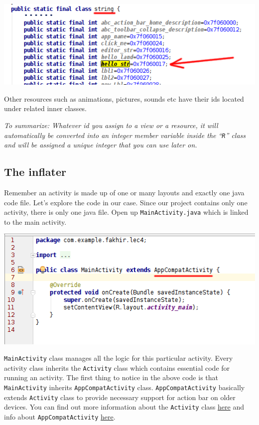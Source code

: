 \begin{center}
	\includegraphics[scale=0.4]{chapters/ch04/images/33}
\end{center}

Other resources such as animations, pictures, sounds etc have their ids located under related inner classes.

\vskip 3mm
\textit{To summarize: Whatever id you assign to a view or a resource, it will automatically be converted into an integer member variable inside the ``\texttt{R}'' class and will be assigned a unique integer that you can use later on.}

\subsection{The inflater}
\label{RAI:inflater}
Remember an activity is made up of one or many layouts and exactly one java code file. Let's explore the code in our case. Since our project contains only one activity, there is only one java file. Open up \texttt{MainActivity.java} which is linked to the main activity. 

\begin{center}
	\includegraphics[scale=0.4]{chapters/ch04/images/34}
\end{center}

\texttt{MainActivity} class manages all the logic for this particular activity. Every activity class inherits the \texttt{Activity} class which contains essential code for running an activity. The first thing to notice in the above code is that \texttt{MainActivity} inherits \texttt{AppCompatActivity} class. \texttt{AppCompatActivity} basically extends \texttt{Activity} class to provide necessary support for action bar on older devices. You can find out more information about the \texttt{Activity} class \href{https://developer.android.com/reference/android/app/Activity.html}{here} and info about \texttt{AppCompatActivity} \href{https://developer.android.com/reference/android/support/v7/app/AppCompatActivity.html}{here}. \\

